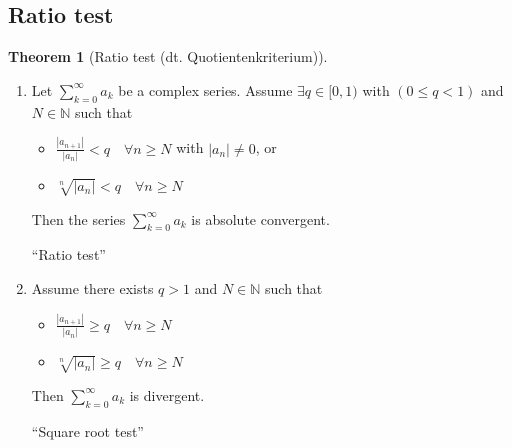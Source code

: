 \documentclass[a4paper,landscape,twocolumn]{article}
\theoremstyle{definition}
\newtheorem{theorem}{Theorem}
\newcommand\abs[1]{\left|#1\right|}
\begin{document}
\subsection{Ratio test}
\begin{theorem}[Ratio test (dt. \foreignlanguage{ngerman}{Quotientenkriterium})]
  \begin{enumerate}
    \item
      Let $\sum_{k=0}^\infty a_k$ be a complex series.
      Assume $\exists q \in [0, 1)$ with $(0 \leq q < 1)$ and $N \in \mathbb N$ such that
      \begin{itemize}
        \item $\frac{\abs{a_{n+1}}}{\abs{a_n}} < q \quad \forall n \geq N$ with $\abs{a_n} \neq 0$, or
        \item $\sqrt[n]{\abs{a_n}} < q \quad \forall n \geq N$
      \end{itemize}
      Then the series $\sum_{k=0}^\infty a_k$ is absolute convergent.
      \begin{center}
        \enquote{Ratio test}
      \end{center}
    \item
      Assume there exists $q > 1$ and $N \in \mathbb N$ such that
      \begin{itemize}
        \item $\frac{\abs{a_{n+1}}}{\abs{a_n}} \geq q \quad \forall n \geq N$
        \item $\sqrt[n]{\abs{a_n}} \geq q \quad \forall n \geq N$
      \end{itemize}
      Then $\sum_{k=0}^\infty a_k$ is divergent.
      \begin{center}
        \enquote{Square root test}
      \end{center}
  \end{enumerate}
\end{theorem}
\end{document}
